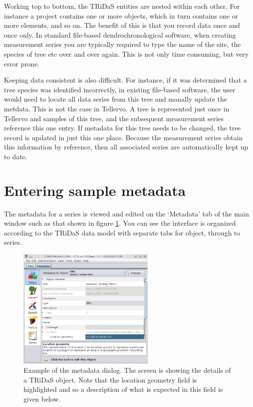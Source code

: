 Working top to bottom, the TRiDaS entities are nested within each other.  For instance a project contains one or more objects, which in turn contains one or more elements, and so on.  The benefit of this is that you record data once and once only.  In standard file-based dendrochronological software, when creating measurement series you are typically required to type the name of the site, the species of tree etc over and over again.  This is not only time consuming, but very error prone.  

Keeping data consistent is also difficult.  For instance, if it was determined that a tree species was identified incorrectly, in existing file-based software, the user would need to locate all data series from this tree and manally update the metdata.  This is not the case in Tellervo.  A tree is represented just once in Tellervo and samples of this tree, and the subsequent measurement series reference this one entry.  If metadata for this tree needs to be changed, the tree record is updated in just this one place.  Because the measurement series obtain this information by reference, then all associated series are automatically kept up to date.

\section{Entering sample metadata}
The metadata for a series is viewed and edited on the `Metadata' tab of the main window such as that shown in figure \ref{fig:metadata}.  You can see the interface is organized according to the TRiDaS data model with separate tabs for object, through to series.  

\begin{figure}
\centering
\includegraphics[width=0.6\textwidth]{Images/metadata.png}
\caption{Example of the metadata dialog.  The screen is showing the details of a TRiDaS object.  Note that the location geometry field is highlighted and so a description of what is expected in this field is given below.} 
\label{fig:metadata}
\end{figure}

